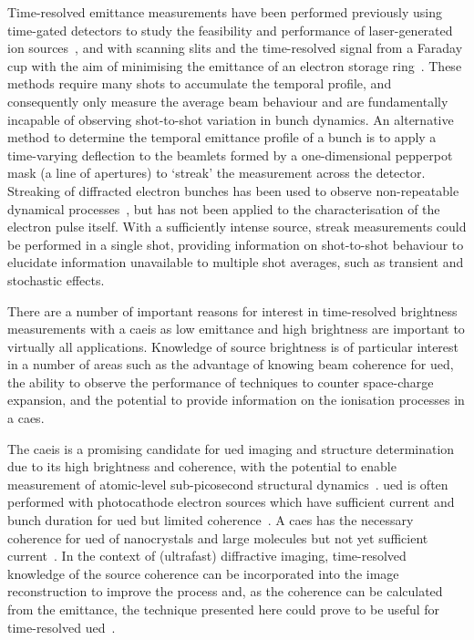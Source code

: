 Time-resolved emittance measurements have been performed previously using time-gated detectors to study the feasibility and performance of laser-generated ion sources~\cite{collier_cern_1996,yoshida_simple_2001}, and with scanning slits and the time-resolved signal from a Faraday cup with the aim of minimising the emittance of an electron storage ring~\cite{walter_time_2003}.
These methods require many shots to accumulate the temporal profile, and consequently only measure the average beam behaviour and are fundamentally incapable of observing shot-to-shot variation in bunch dynamics.
An alternative method to determine the temporal emittance profile of a bunch is to apply a time-varying deflection to the beamlets formed by a one-dimensional pepperpot mask (a line of apertures) to `streak' the measurement across the detector.
Streaking of diffracted electron bunches has been used to observe non-repeatable dynamical processes~\cite{li_note:_2010, mukojima_streak-camera_2015}, but has not been applied to the characterisation of the electron pulse itself.
With a sufficiently intense source, streak measurements could be performed in a single shot, providing information on shot-to-shot behaviour to elucidate information unavailable to multiple shot averages, such as transient and stochastic effects.

There are a number of important reasons for interest in time-resolved brightness measurements with a \gls{caeis} as low emittance and high brightness are important to virtually all applications.
Knowledge of source brightness is of particular interest in a number of areas such as the advantage of knowing beam coherence for \gls{ued}, the ability to observe the performance of techniques to counter space-charge expansion, and the potential to provide information on the ionisation processes in a \gls{caes}.

The \gls{caeis} is a promising candidate for \gls{ued} imaging and structure determination due to its high brightness and coherence, with the potential to enable measurement of atomic-level sub-picosecond structural dynamics~\cite{siwick_atomic-level_2003,putkunz_atom-scale_2012,sparkes_high-coherence_2014}.
\gls{ued} is often performed with photocathode electron sources which have sufficient current and bunch duration for \gls{ued} but limited coherence~\cite{van_oudheusden_electron_2007,tokita_single-shot_2009,sciaini_femtosecond_2011}.
A \gls{caes} has the necessary coherence for \gls{ued} of nanocrystals and large molecules but not yet sufficient current~\cite{saliba_spatial_2012,mcculloch_high-coherence_2013}.
In the context of (ultrafast) diffractive imaging, time-resolved knowledge of the source coherence can be incorporated into the image reconstruction to improve the process and, as the coherence can be calculated from the emittance, the technique presented here could prove to be useful for time-resolved \gls{ued}~\cite{flewett_extracting_2009,abbey_lensless_2011}.


